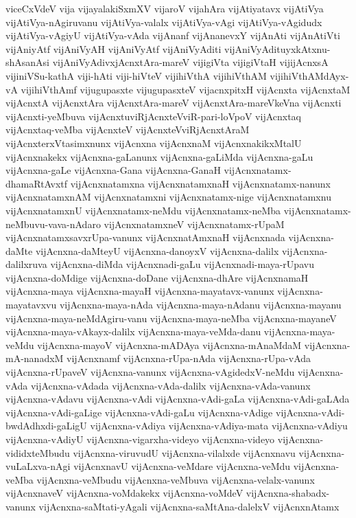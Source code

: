 {viceCxVdeV
vija
vijayalakiSxmXV
vijaroV
vijahAra
vijAtiyatavx
vijAtiVya
vijAtiVya-nAgiruvanu
vijAtiVya-valalx
vijAtiVya-vAgi
vijAtiVya-vAgidudx
vijAtiVya-vAgiyU
vijAtiVya-vAda
vijAnanf
vijAnanevxY
vijAnAti
vijAnAtiVti
vijAniyAtf
vijAniVyAH
vijAniVyAtf
vijAniVyAditi
vijAniVyAdituyxkAtxnu-shAsanAsi
vijAniVyAdivxjAcnxtAra-mareV
vijigiVta
vijigiVtaH
vijijAcnxsA
vijiniVSu-kathA
viji-hAti
viji-hiVteV
vijihiVthA
vijihiVthAM
vijihiVthAMdAyx-vA
vijihiVthAmf
vijugupasxte
vijugupasxteV
vijacnxpitxH
vijAcnxta
vijAcnxtaM
vijAcnxtA
vijAcnxtAra
vijAcnxtAra-mareV
vijAcnxtAra-mareVkeVna
vijAcnxti
vijAcnxti-yeMbuva
vijAcnxtuviRjAcnxteVviR-pari-loVpoV
vijAcnxtaq
vijAcnxtaq-veMba
vijAcnxteV
vijAcnxteVviRjAcnxtAraM
vijAcnxterxVtasimxnunx
vijAcnxna
vijAcnxnaM
vijAcnxnakikxMtalU
vijAcnxnakekx
vijAcnxna-gaLanunx
vijAcnxna-gaLiMda
vijAcnxna-gaLu
vijAcnxna-gaLe
vijAcnxna-Gana
vijAcnxna-GanaH
vijAcnxnatamx-dhamaRtAvxtf
vijAcnxnatamxna
vijAcnxnatamxnaH
vijAcnxnatamx-nanunx
vijAcnxnatamxnAM
vijAcnxnatamxni
vijAcnxnatamx-nige
vijAcnxnatamxnu
vijAcnxnatamxnU
vijAcnxnatamx-neMdu
vijAcnxnatamx-neMba
vijAcnxnatamx-neMbuvu-vava-nAdaro
vijAcnxnatamxneV
vijAcnxnatamx-rUpaM
vijAcnxnatamxsavxrUpa-vanunx
vijAcnxnatAmxnaH
vijAcnxnada
vijAcnxna-daMte
vijAcnxna-daMteyU
vijAcnxna-danoyxV
vijAcnxna-dalilx
vijAcnxna-dalilxruva
vijAcnxna-diMda
vijAcnxnadi-gaLu
vijAcnxnadi-maya-rUpavu
vijAcnxna-doMdige
vijAcnxna-doDane
vijAcnxna-dhAre
vijAcnxnamaH
vijAcnxna-maya
vijAcnxna-mayaH
vijAcnxna-mayatavx-vanunx
vijAcnxna-mayatavxvu
vijAcnxna-maya-nAda
vijAcnxna-maya-nAdanu
vijAcnxna-mayanu
vijAcnxna-maya-neMdAgiru-vanu
vijAcnxna-maya-neMba
vijAcnxna-mayaneV
vijAcnxna-maya-vAkayx-dalilx
vijAcnxna-maya-veMda-danu
vijAcnxna-maya-veMdu
vijAcnxna-mayoV
vijAcnxna-mADAya
vijAcnxna-mAnaMdaM
vijAcnxna-mA-nanadxM
vijAcnxnamf
vijAcnxna-rUpa-nAda
vijAcnxna-rUpa-vAda
vijAcnxna-rUpaveV
vijAcnxna-vanunx
vijAcnxna-vAgidedxV-neMdu
vijAcnxna-vAda
vijAcnxna-vAdada
vijAcnxna-vAda-dalilx
vijAcnxna-vAda-vanunx
vijAcnxna-vAdavu
vijAcnxna-vAdi
vijAcnxna-vAdi-gaLa
vijAcnxna-vAdi-gaLAda
vijAcnxna-vAdi-gaLige
vijAcnxna-vAdi-gaLu
vijAcnxna-vAdige
vijAcnxna-vAdi-bwdAdhxdi-gaLigU
vijAcnxna-vAdiya
vijAcnxna-vAdiya-mata
vijAcnxna-vAdiyu
vijAcnxna-vAdiyU
vijAcnxna-vigarxha-videyo
vijAcnxna-videyo
vijAcnxna-vididxteMbudu
vijAcnxna-viruvudU
vijAcnxna-vilalxde
vijAcnxnavu
vijAcnxna-vuLaLxva-nAgi
vijAcnxnavU
vijAcnxna-veMdare
vijAcnxna-veMdu
vijAcnxna-veMba
vijAcnxna-veMbudu
vijAcnxna-veMbuva
vijAcnxna-velalx-vanunx
vijAcnxnaveV
vijAcnxna-voMdakekx
vijAcnxna-voMdeV
vijAcnxna-shabadx-vanunx
vijAcnxna-saMtati-yAgali
vijAcnxna-saMtAna-dalelxV
vijAcnxnAtamx
}
